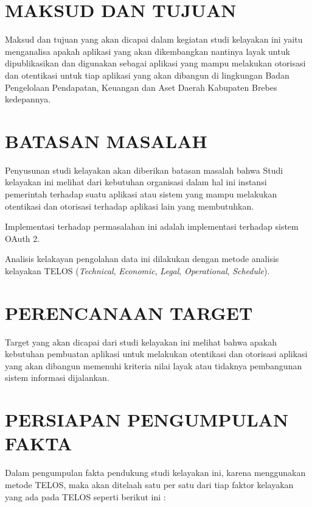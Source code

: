 \documentclass[pdftex,12pt, oneside]{article}
\begin{document}
\section{MAKSUD DAN TUJUAN}

Maksud dan tujuan yang akan dicapai dalam kegiatan studi kelayakan ini yaitu menganalisa apakah aplikasi yang akan dikembangkan nantinya layak untuk dipublikasikan dan digunakan sebagai aplikasi yang mampu melakukan otorisasi dan otentikasi untuk tiap aplikasi yang akan dibangun di lingkungan Badan Pengelolaan Pendapatan, Keuangan dan Aset Daerah Kabupaten Brebes kedepannya.

\section{BATASAN MASALAH}

Penyusunan studi kelayakan akan diberikan batasan masalah bahwa Studi kelayakan ini melihat dari kebutuhan organisasi dalam hal ini instansi pemerintah terhadap suatu aplikasi atau sistem yang mampu melakukan otentikasi dan otorisasi terhadap aplikasi lain yang membutuhkan. 

Implementasi terhadap permasalahan ini adalah implementasi terhadap sistem OAuth 2.

Analisis kelakayan pengolahan data ini dilakukan dengan metode analisis kelayakan TELOS (\textit{Technical}, \textit{Economic}, \textit{Legal}, \textit{Operational}, \textit{Schedule}).
  
\section{PERENCANAAN TARGET}

Target yang akan dicapai dari studi kelayakan ini melihat bahwa apakah kebutuhan pembuatan aplikasi untuk melakukan otentikasi dan otorisasi aplikasi yang akan dibangun memenuhi kriteria nilai layak atau tidaknya pembangunan sistem informasi dijalankan.

\section{PERSIAPAN PENGUMPULAN FAKTA}

Dalam pengumpulan fakta pendukung studi kelayakan ini, karena menggunakan metode TELOS, maka akan ditelaah satu per satu dari tiap faktor kelayakan yang ada pada TELOS seperti berikut ini :
\end{document}
